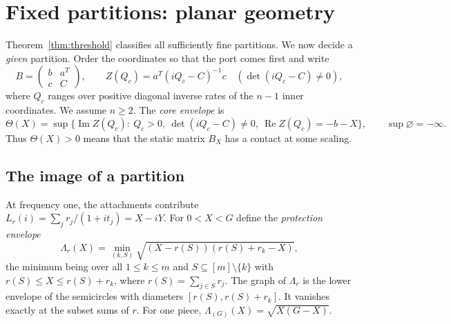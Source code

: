 \documentclass[11pt,a4paper]{article}
\theoremstyle{plain}
\theoremstyle{definition}
\theoremstyle{remark}
\newcommand{\Real}{\operatorname{Re}}
\newcommand{\Imag}{\operatorname{Im}}
\newcommand{\Env}{\Lambda}
\newcommand{\Core}{\Theta}
\begin{document}
\section{Fixed partitions: planar geometry}\label{sec:planar}

Theorem~\ref{thm:threshold} classifies all sufficiently fine partitions. We now
decide a \emph{given} partition. Order the coordinates so that the port comes
first and write
\[
 B=\begin{pmatrix}b&a^{T}\\ c&C\end{pmatrix},\qquad
 Z(Q_c)=a^{T}(iQ_c-C)^{-1}c\quad(\det(iQ_c-C)\ne0),
\]
where $Q_c$ ranges over positive diagonal inverse rates of the $n-1$ inner
coordinates. We assume $n\ge2$. The \emph{core envelope} is
\begin{equation}\label{eq:coreenv}
 \Core(X)=\sup\bigl\{\Imag Z(Q_c):\ Q_c>0,\ \det(iQ_c-C)\ne0,\ \Real Z(Q_c)=-b-X\bigr\},
 \qquad \sup\varnothing=-\infty .
\end{equation}
Thus $\Core(X)>0$ means that the static matrix $B_X$ has a contact at some
scaling.

\subsection{The image of a partition}
At frequency one, the attachments contribute
$L_r(i)=\sum_jr_j/(1+it_j)=X-iY$. For $0<X<G$ define the \emph{protection
envelope}
\begin{equation}\label{eq:envelope}
 \Env_r(X)=\min_{(k,S)}\sqrt{(X-r(S))(r(S)+r_k-X)},
\end{equation}
the minimum being over all $1\le k\le m$ and $S\subseteq[m]\setminus\{k\}$ with
$r(S)\le X\le r(S)+r_k$,
where $r(S)=\sum_{j\in S}r_j$. The graph of $\Env_r$ is the lower envelope of
the semicircles with diameters $[r(S),r(S)+r_k]$. It vanishes exactly at the
subset sums of $r$. For one piece, $\Env_{(G)}(X)=\sqrt{X(G-X)}$.
\end{document}
